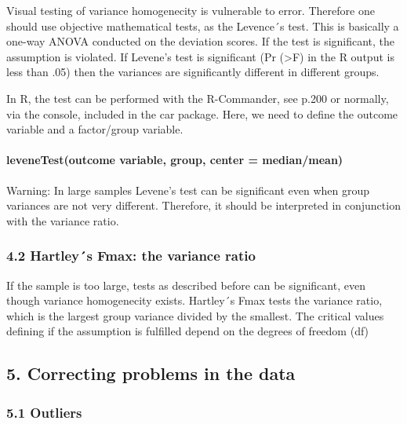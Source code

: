 \documentclass[
]{article}
\begin{document}
Visual testing of variance homogenecity is vulnerable to error.
Therefore one should use objective mathematical tests, as the Levence´s
test. This is basically a one-way ANOVA conducted on the deviation
scores. If the test is significant, the assumption is violated. If
Levene's test is significant (Pr (\textgreater F) in the R output is
less than .05) then the variances are significantly different in
different groups.

In R, the test can be performed with the R-Commander, see p.200 or
normally, via the console, included in the car package. Here, we need to
define the outcome variable and a factor/group variable.

\hypertarget{levenetestoutcome-variable-group-center-medianmean}{%
\paragraph{leveneTest(outcome variable, group, center =
median/mean)}\label{levenetestoutcome-variable-group-center-medianmean}}

Warning: In large samples Levene's test can be significant even when
group variances are not very different. Therefore, it should be
interpreted in conjunction with the variance ratio.

\hypertarget{hartleys-fmax-the-variance-ratio}{%
\subsubsection{4.2 Hartley´s Fmax: the variance
ratio}\label{hartleys-fmax-the-variance-ratio}}

If the sample is too large, tests as described before can be
significant, even though variance homogenecity exists. Hartley´s Fmax
tests the variance ratio, which is the largest group variance divided by
the smallest. The critical values defining if the assumption is
fulfilled depend on the degrees of freedom (df)

\hypertarget{correcting-problems-in-the-data}{%
\subsection{5. Correcting problems in the
data}\label{correcting-problems-in-the-data}}

\hypertarget{outliers}{%
\subsubsection{5.1 Outliers}\label{outliers}}
\end{document}
